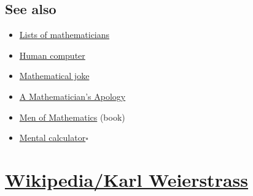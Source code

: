 \documentclass{book}
\numberwithin{equation}{section}
\begin{document}
\section{See also}
\begin{itemize}
    \item \href{https://en.wikipedia.org/wiki/Lists_of_mathematicians}{Lists of mathematicians}
    \item \href{https://en.wikipedia.org/wiki/Human_computer}{Human computer}
    \item \href{https://en.wikipedia.org/wiki/Mathematical_joke}{Mathematical joke}
    \item \href{https://en.wikipedia.org/wiki/A_Mathematician's_Apology}{A Mathematician's Apology}
    \item \href{https://en.wikipedia.org/wiki/Men_of_Mathematics}{Men of Mathematics} (book)
    \item \href{https://en.wikipedia.org/wiki/Mental_calculator}{Mental calculator}\hfill$\square$
\end{itemize}


\chapter{\href{https://en.wikipedia.org/wiki/Karl_Weierstrass}{Wikipedia/Karl Weierstrass}}
\end{document}
